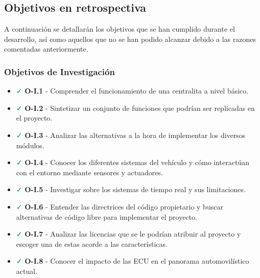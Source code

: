 \subsection{Objetivos en retrospectiva}

A continuación se detallarán los objetivos que se han cumplido durante el desarrollo, así como aquellos que no se han podido alcanzar debido a las razones comentadas anteriormente. 


\subsubsection*{Objetivos de Investigación}

\begin{itemize}
    \item \textcolor{teal}{\faCheck} \textbf{O-I.1} - Comprender el funcionamiento de una centralita a nivel básico.
    \item \textcolor{teal}{\faCheck}  \textbf{O-I.2} - Sintetizar un conjunto de funciones que podrían ser replicadas en el proyecto.
    \item \textcolor{teal}{\faCheck}  \textbf{O-I.3} - Analizar las alternativas a la hora de implementar los diversos módulos.
    \item \textcolor{teal}{\faCheck}  \textbf{O-I.4} - Conocer los diferentes sistemas del vehículo y cómo interactúan con el entorno mediante sensores y actuadores.
    \item \textcolor{teal}{\faCheck}  \textbf{O-I.5} - Investigar sobre los sistemas de tiempo real y sus limitaciones.
    \item \textcolor{teal}{\faCheck}  \textbf{O-I.6} - Entender las directrices del código propietario y buscar alternativas de código libre para implementar el proyecto.
    \item \textcolor{teal}{\faCheck} \textbf{O-I.7} - Analizar las licencias que se le podrían atribuir al proyecto y escoger una de estas acorde a las características.
    \item \textcolor{teal}{\faCheck} \textbf{O-I.8} - Conocer el impacto de las ECU en el panorama automovilístico actual. 
\end{itemize}

